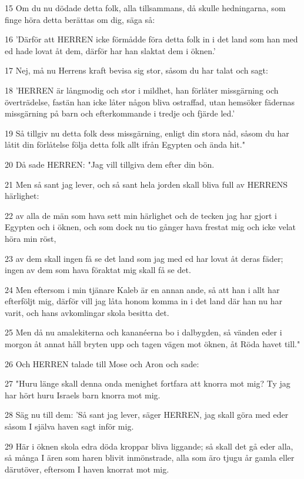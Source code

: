 \par 15 Om du nu dödade detta folk, alla tillsammans, då skulle hedningarna, som finge höra detta berättas om dig, säga så:
\par 16 'Därför att HERREN icke förmådde föra detta folk in i det land som han med ed hade lovat åt dem, därför har han slaktat dem i öknen.'
\par 17 Nej, må nu Herrens kraft bevisa sig stor, såsom du har talat och sagt:
\par 18 'HERREN är långmodig och stor i mildhet, han förlåter missgärning och överträdelse, fastän han icke låter någon bliva ostraffad, utan hemsöker fädernas missgärning på barn och efterkommande i tredje och fjärde led.'
\par 19 Så tillgiv nu detta folk dess missgärning, enligt din stora nåd, såsom du har låtit din förlåtelse följa detta folk allt ifrån Egypten och ända hit."
\par 20 Då sade HERREN: "Jag vill tillgiva dem efter din bön.
\par 21 Men så sant jag lever, och så sant hela jorden skall bliva full av HERRENS härlighet:
\par 22 av alla de män som hava sett min härlighet och de tecken jag har gjort i Egypten och i öknen, och som dock nu tio gånger hava frestat mig och icke velat höra min röst,
\par 23 av dem skall ingen få se det land som jag med ed har lovat åt deras fäder; ingen av dem som hava föraktat mig skall få se det.
\par 24 Men eftersom i min tjänare Kaleb är en annan ande, så att han i allt har efterföljt mig, därför vill jag låta honom komma in i det land där han nu har varit, och hans avkomlingar skola besitta det.
\par 25 Men då nu amalekiterna och kananéerna bo i dalbygden, så vänden eder i morgon åt annat håll bryten upp och tagen vägen mot öknen, åt Röda havet till."
\par 26 Och HERREN talade till Mose och Aron och sade:
\par 27 "Huru länge skall denna onda menighet fortfara att knorra mot mig? Ty jag har hört huru Israels barn knorra mot mig.
\par 28 Säg nu till dem: 'Så sant jag lever, säger HERREN, jag skall göra med eder såsom I själva haven sagt inför mig.
\par 29 Här i öknen skola edra döda kroppar bliva liggande; så skall det gå eder alla, så många I ären som haren blivit inmönstrade, alla som äro tjugu år gamla eller därutöver, eftersom I haven knorrat mot mig.
